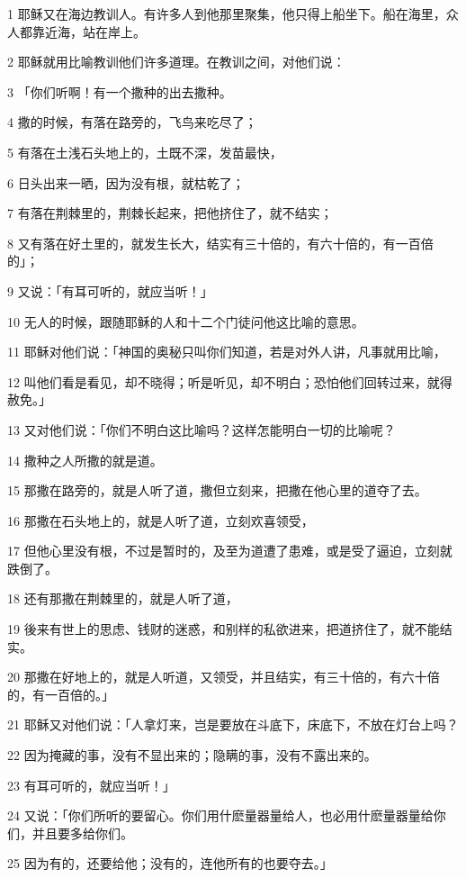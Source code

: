 \par 1 耶稣又在海边教训人。有许多人到他那里聚集，他只得上船坐下。船在海里，众人都靠近海，站在岸上。
\par 2 耶稣就用比喻教训他们许多道理。在教训之间，对他们说：
\par 3 「你们听啊！有一个撒种的出去撒种。
\par 4 撒的时候，有落在路旁的，飞鸟来吃尽了；
\par 5 有落在土浅石头地上的，土既不深，发苗最快，
\par 6 日头出来一晒，因为没有根，就枯乾了；
\par 7 有落在荆棘里的，荆棘长起来，把他挤住了，就不结实；
\par 8 又有落在好土里的，就发生长大，结实有三十倍的，有六十倍的，有一百倍的」；
\par 9 又说：「有耳可听的，就应当听！」
\par 10 无人的时候，跟随耶稣的人和十二个门徒问他这比喻的意思。
\par 11 耶稣对他们说：「神国的奥秘只叫你们知道，若是对外人讲，凡事就用比喻，
\par 12 叫他们看是看见，却不晓得；听是听见，却不明白；恐怕他们回转过来，就得赦免。」
\par 13 又对他们说：「你们不明白这比喻吗？这样怎能明白一切的比喻呢？
\par 14 撒种之人所撒的就是道。
\par 15 那撒在路旁的，就是人听了道，撒但立刻来，把撒在他心里的道夺了去。
\par 16 那撒在石头地上的，就是人听了道，立刻欢喜领受，
\par 17 但他心里没有根，不过是暂时的，及至为道遭了患难，或是受了逼迫，立刻就跌倒了。
\par 18 还有那撒在荆棘里的，就是人听了道，
\par 19 後来有世上的思虑、钱财的迷惑，和别样的私欲进来，把道挤住了，就不能结实。
\par 20 那撒在好地上的，就是人听道，又领受，并且结实，有三十倍的，有六十倍的，有一百倍的。」
\par 21 耶稣又对他们说：「人拿灯来，岂是要放在斗底下，床底下，不放在灯台上吗？
\par 22 因为掩藏的事，没有不显出来的；隐瞒的事，没有不露出来的。
\par 23 有耳可听的，就应当听！」
\par 24 又说：「你们所听的要留心。你们用什麽量器量给人，也必用什麽量器量给你们，并且要多给你们。
\par 25 因为有的，还要给他；没有的，连他所有的也要夺去。」
